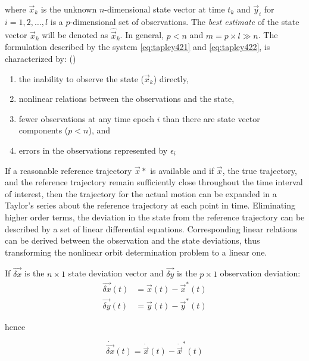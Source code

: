 where \(\vec{x}_k\) is the unknown \(n\)-dimensional state vector at time \(t_k\) and
\(\vec{y}_i\) for \(i=1,2,\ldots ,l\) is a \(p\)-dimensional set of observations. The
\emph{best estimate} of the state vector \(\vec{x}_k\) will be denoted as \(\hat{\vec{x}}_k\).
In general, \(p<n\) and \( m = p \times l \gg n \). The formulation described by the
system \ref{eq:tapley421} and \ref{eq:tapley422}, is characterized by: (\cite{tapley})
\begin{enumerate}
	\item the inability to observe the state (\(\vec{x}_k\)) directly,
	\item nonlinear relations between the observations and the state,
	\item fewer observations at any time epoch \(i\) than there are state vector
	      components (\(p<n\)), and
	\item errors in the observations represented by \({\epsilon}_i\)
\end{enumerate}

If a reasonable reference trajectory \(\vec{x}*\) is available and if
\(\vec{x}\), the true trajectory, and the reference trajectory remain sufficiently
close throughout the time interval of interest, then the trajectory for the actual
motion can be expanded in a Taylor’s series about the reference trajectory at
each point in time. Eliminating higher order terms, the deviation in the state
from the reference trajectory can be described by a set of linear differential
equations. Corresponding linear relations can be derived between the observation
and the state deviations, thus transforming the nonlinear orbit determination problem
to a linear one.

If \(\vec{\delta x}\) is the \( n \times 1 \) state deviation vector and
\(\vec{\delta y}\) is the \(p \times 1\) observation deviation:
\begin{equation}
	\begin{aligned}
		\vec{\delta x} (t) & = \vec{x}(t) - \vec{x}^* (t) \\
		\vec{\delta y} (t) & = \vec{y}(t) - \vec{y}^*(t)
	\end{aligned}
\end{equation}

hence

\begin{equation}
	\dot{\vec{\delta x}} (t) = \dot{\vec{x}} (t) - \dot{\vec{x}}^* (t)
\end{equation}

